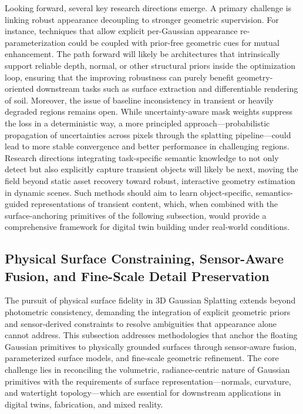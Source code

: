 \documentclass[11pt,a4paper]{article}
\begin{document}
Looking forward, several key research directions emerge. A primary challenge is linking robust appearance decoupling to stronger geometric supervision. For instance, techniques that allow explicit per-Gaussian appearance re-parameterization could be coupled with prior-free geometric cues for mutual enhancement. The path forward will likely be architectures that intrinsically support reliable depth, normal, or other structural priors inside the optimization loop, ensuring that the improving robustness can purely benefit geometry-oriented downstream tasks such as surface extraction and differentiable rendering of soil. Moreover, the issue of baseline inconsistency in transient or heavily degraded regions remains open. While uncertainty-aware mask weights suppress the loss in a deterministic way, a more principled approach---probabilistic propagation of uncertainties across pixels through the splatting pipeline---could lead to more stable convergence and better performance in challenging regions. Research directions integrating task-specific semantic knowledge to not only detect but also explicitly capture transient objects will likely be next, moving the field beyond static asset recovery toward robust, interactive geometry estimation in dynamic scenes. Such methods should aim to learn object-specific, semantics-guided representations of transient content, which, when combined with the surface-anchoring primitives of the following subsection, would provide a comprehensive framework for digital twin building under real-world conditions.


\subsection{Physical Surface Constraining, Sensor-Aware Fusion, and Fine-Scale Detail Preservation}


The pursuit of physical surface fidelity in 3D Gaussian Splatting extends beyond photometric consistency, demanding the integration of explicit geometric priors and sensor-derived constraints to resolve ambiguities that appearance alone cannot address. This subsection addresses methodologies that anchor the floating Gaussian primitives to physically grounded surfaces through sensor-aware fusion, parameterized surface models, and fine-scale geometric refinement. The core challenge lies in reconciling the volumetric, radiance-centric nature of Gaussian primitives with the requirements of surface representation---normals, curvature, and watertight topology---which are essential for downstream applications in digital twins, fabrication, and mixed reality.
\end{document}
